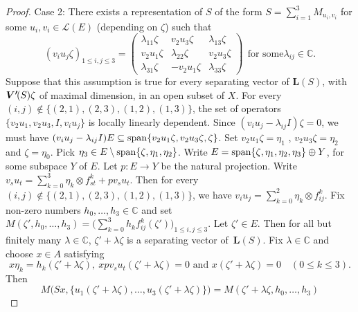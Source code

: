 \documentclass[a4paper,12pt,reqno]{amsart}
\numberwithin{equation}{section}
\theoremstyle{definition}
\begin{document}
\begin{proof}
\smallskip\noindent
Case 2:
There exists a representation of ${S}$ of the form  ${S}= \sum_{i=1}^3 M_{u_i,v_i}$
for some $u_i, v_i \in{{\mathscr L}(E)}$ (depending on $\zeta$) such that
\begin{equation*}
(v_iu_j \zeta)_{1 \leq i,j \leq 3}= \left(\begin{array}{ccc}
                                             \lambda_{11} \zeta & v_2u_3\zeta & \lambda_{13} \zeta\\
                                             v_2u_1 \zeta& \lambda_{22} \zeta & v_2u_3 \zeta \\
                                             \lambda_{31} \zeta & -v_2u_1 \zeta &\lambda_{33} \zeta
                                           \end{array}\right)\ \  \text{for some} \lambda_{ij} \in {\mathbb{C}}.
\end{equation*}
Suppose that this assumption is true for every separating vector of ${{\bm L(S)}}$, with ${{\bm{V'}\mkern-2.5mu(S)}} \zeta$ of maximal dimension, in an open subset of $X$.
For every $ (i,j) \not\in \{(2,1), (2,3), (1,2), (1,3)   \} $,  the set of operators  $\{v_2 u_1, v_2 u_3, I,  v_i u_j\}$
is locally linearly dependent. Since $(v_i u_j-\lambda_{ij} I) \zeta=0$, we must have
$(v_i u_j-\lambda_{ij} I) E \subseteq {{\rm span}} \{ v_2 u_1 \zeta, v_2 u_3 \zeta, \zeta\}$.
Set $ v_2 u_1 \zeta= \eta_1$ ,  $ v_2 u_3 \zeta= \eta_2$ and $\zeta= \eta_0$.
Pick  $\eta_3  \in E \setminus {{\rm span}} \{ \zeta, \eta_1, \eta_2\}$. Write $E= {{\rm span}} \{\zeta, \eta_1, \eta_2, \eta_3\} \oplus Y$,
for some subspace $Y$ of $E$. Let  $p\colon E \rightarrow Y$ be the natural projection.
Write $v_s u_t = \sum_{k=0}^3 \eta_k \otimes f_{st}^k + pv_su_t$. Then
for every $ (i,j) \not\in \{(2,1), (2,3), (1,2), (1,3)   \}$, we have $v_i u_j = \sum_{k=0}^2 \eta_k \otimes f_{ij}^k$.
Fix non-zero numbers $h_0, \ldots, h_3 \in {\mathbb{C}}$ and set $ M(\zeta', h_0, \ldots, h_3)= \bigl(\sum_{k=0}^3 h_k f_{ij}^k (\zeta' )\bigr)_{1 \leq i,j \leq 3}$.
Let $\zeta' \in E$. Then for all but finitely many $\lambda \in {\mathbb{C}}$, $\zeta'+ \lambda \zeta$ is a separating vector of~${{\bm L(S)}}$.
Fix $\lambda \in {\mathbb{C}}$ and choose $x \in A$ satisfying
\begin{equation*}
x \eta_k= h_k (\zeta'+ \lambda \zeta), \  x pv_su_t(\zeta'+ \lambda \zeta)=0\text{ and }  x (\zeta'+ \lambda \zeta)=0\quad(0 \leq k \leq 3).
\end{equation*}
Then
\begin{equation*}
M\bigl(Sx, \{u_1 (\zeta'+\lambda\zeta), \ldots, u_3 (\zeta'+ \lambda\zeta)\}\bigr)=M(\zeta'+ \lambda \zeta, h_0, \ldots, h_3)

\end{equation*}
\end{proof}
\end{document}
